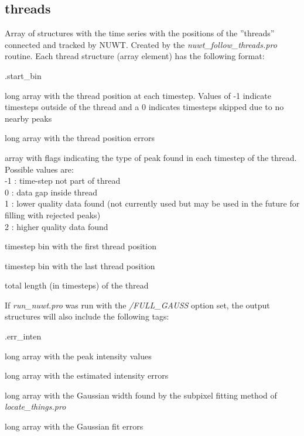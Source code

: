 \documentclass{article}
\begin{document}
\subsection{threads}
Array of structures with the time series with the positions of the ''threads'' connected and tracked by NUWT. Created by the \textit{nuwt\_follow\_threads.pro} routine. Each thread structure (array element) has the following format:

\begin{labeling}{.start\_bin}
\item[.pos] [nt] long array with the thread position at each timestep.
Values of -1 indicate timesteps outside of the thread and
a 0 indicates timesteps skipped due to no nearby peaks
\item[.err\_pos] [nt] long array with the thread position errors
\item[.bin\_flags] [nt] array with flags indicating the type of peak
found in each timestep of the thread. Possible values are: \\
-1 : time-step not part of thread \\
0 : data gap inside thread \\
1 : lower quality data found (not currently used but
may be used in the future for filling with rejected peaks) \\
2 : higher quality data found \\
\item[.start\_bin] timestep bin with the first thread position
\item[.end\_bin] timestep bin with the last thread position
\item[.length] total length (in timesteps) of the thread
\end{labeling}
If \textit{run\_nuwt.pro} was run with the \textit{/FULL\_GAUSS} option set,
the output structures will also include the following tags:
\begin{labeling}{.err\_inten}
\item[.inten] [nt] long array with the peak intensity values
\item[.err\_inten] [nt] long array with the estimated intensity errors
\item[.wid] [nt] long array with the Gaussian width found by the
subpixel fitting method of \textit{locate\_things.pro}
\item[.err\_wid] [nt] long array with the Gaussian fit errors
\end{labeling}


\end{document}

